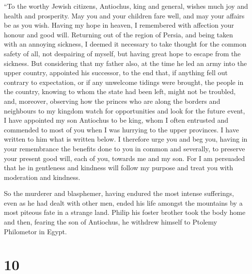  ``To the worthy Jewish citizens, Antiochus, king and
general, wishes much joy and health and prosperity.  May
you and your children fare well, and may your affairs be as you wish.
Having my hope in heaven,  I remembered with affection your
honour and good will. Returning out of the region of Persia, and being
taken with an annoying sickness, I deemed it necessary to take thought
for the common safety of all,  not despairing of myself,
but having great hope to escape from the sickness.  But
considering that my father also, at the time he led an army into the
upper country, appointed his successor,  to the end that,
if anything fell out contrary to expectation, or if any unwelcome
tidings were brought, the people in the country, knowing to whom the
state had been left, might not be troubled,  and, moreover,
observing how the princes who are along the borders and neighbours to my
kingdom watch for opportunities and look for the future event, I have
appointed my son Antiochus to be king, whom I often entrusted and
commended to most of you when I was hurrying to the upper provinces. I
have written to him what is written below.  I therefore
urge you and beg you, having in your remembrance the benefits done to
you in common and severally, to preserve your present good will, each of
you, towards me and my son.  For I am persuaded that he in
gentleness and kindness will follow my purpose and treat you with
moderation and kindness.

 So the murderer and blasphemer, having endured the most
intense sufferings, even as he had dealt with other men, ended his life
amongst the mountains by a most piteous fate in a strange land.
 Philip his foster brother took the body home and then,
fearing the son of Antiochus, he withdrew himself to Ptolemy Philometor
in Egypt.

\hypertarget{section-8}{%
\section{10}\label{section-8}}

